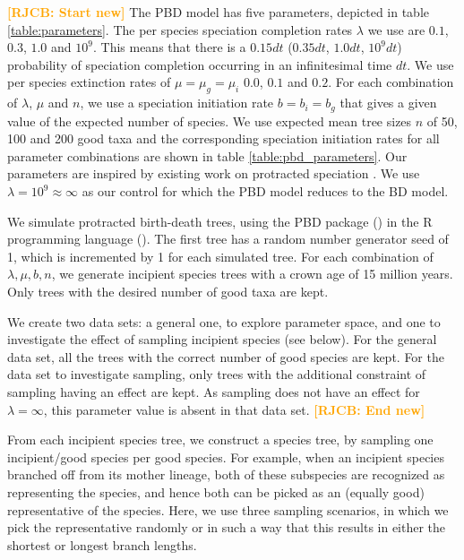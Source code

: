 \documentclass{article}
\newcommand*\richel[1]{\textcolor{orange}{\textbf{[RJCB: #1]}}}
\begin{document}

\richel{Start new}
The PBD model has five parameters, depicted in table \ref{table:parameters}. 
The per species speciation completion rates $\lambda$ we use are $0.1$, $0.3$, $1.0$ and $10^9$. This means that there is a $0.15 dt$ ($0.35 dt$, $1.0 dt$, $10^9 dt$) probability of speciation completion occurring in an infinitesimal time $dt$. 
We use per species extinction rates of $\mu = \mu_g = \mu_i$ $0.0$, $0.1$ and $0.2$.
For each combination of $\lambda$, $\mu$ and $n$, we use a speciation initiation rate $b = b_i = b_g$ that gives a given value of the expected number of species. We use expected mean tree sizes $n$ of 50, 100 and 200 good taxa and the corresponding speciation initiation rates for all parameter combinations are shown in table \ref{table:pbd_parameters}.
Our parameters are inspired by existing work on protracted speciation \cite{etienne_and_rosindell_2012}\cite{etienne2014}.
We use $\lambda = 10^9 \approx \infty$ as our control for which the PBD model reduces to the BD model.

We simulate protracted birth-death trees, using the PBD package (\cite{pbd}) in the R programming language (\cite{r}).
The first tree has a random number generator seed of 1, which is incremented by 1 for each simulated tree.
For each combination of ${\lambda, \mu, b, n}$, we generate incipient species trees with a crown age of 15 million years.
Only trees with the desired number of good taxa are kept.

We create two data sets: a general one, to explore parameter space, 
and one to investigate the effect of sampling incipient species (see below).
For the general data set, all the trees with the correct number of good species are kept.
For the data set to investigate sampling, only trees with the additional constraint of sampling having an effect are kept.
As sampling does not have an effect for $\lambda = \infty$, this parameter value is absent in that data set.
\richel{End new}

From each incipient species tree, we construct a species tree,
by sampling one incipient/good species per good species. 
For example, when an
incipient species branched off from its mother lineage, 
both of these subspecies are recognized as representing the species, 
and hence both can be picked as an (equally good) representative of the species. 
Here, we use three sampling scenarios,
in which we pick the representative randomly or in such a way that this
results in either the shortest or longest branch lengths. 
\end{document}
